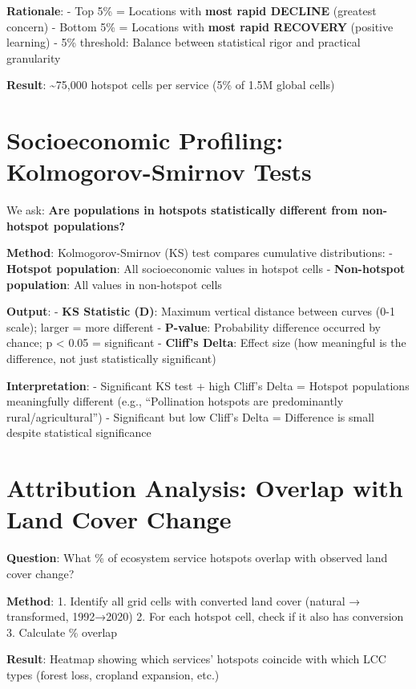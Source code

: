 \documentclass[
  letterpaper,
  DIV=11,
  numbers=noendperiod]{scrreprt}
\begin{document}
\textbf{Rationale}: - Top 5\% = Locations with \textbf{most rapid
DECLINE} (greatest concern) - Bottom 5\% = Locations with \textbf{most
rapid RECOVERY} (positive learning) - 5\% threshold: Balance between
statistical rigor and practical granularity

\textbf{Result}: \textasciitilde75,000 hotspot cells per service (5\% of
1.5M global cells)

\section{Socioeconomic Profiling: Kolmogorov-Smirnov
Tests}\label{socioeconomic-profiling-kolmogorov-smirnov-tests}

We ask: \textbf{Are populations in hotspots statistically different from
non-hotspot populations?}

\textbf{Method}: Kolmogorov-Smirnov (KS) test compares cumulative
distributions: - \textbf{Hotspot population}: All socioeconomic values
in hotspot cells - \textbf{Non-hotspot population}: All values in
non-hotspot cells

\textbf{Output}: - \textbf{KS Statistic (D)}: Maximum vertical distance
between curves (0-1 scale); larger = more different - \textbf{P-value}:
Probability difference occurred by chance; p \textless{} 0.05 =
significant - \textbf{Cliff's Delta}: Effect size (how meaningful is the
difference, not just statistically significant)

\textbf{Interpretation}: - Significant KS test + high Cliff's Delta =
Hotspot populations meaningfully different (e.g., ``Pollination hotspots
are predominantly rural/agricultural'') - Significant but low Cliff's
Delta = Difference is small despite statistical significance

\section{Attribution Analysis: Overlap with Land Cover
Change}\label{attribution-analysis-overlap-with-land-cover-change}

\textbf{Question}: What \% of ecosystem service hotspots overlap with
observed land cover change?

\textbf{Method}: 1. Identify all grid cells with converted land cover
(natural → transformed, 1992→2020) 2. For each hotspot cell, check if it
also has conversion 3. Calculate \% overlap

\textbf{Result}: Heatmap showing which services' hotspots coincide with
which LCC types (forest loss, cropland expansion, etc.)
\end{document}
